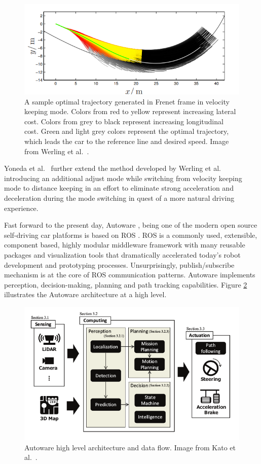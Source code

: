 \begin{figure}[h]
  \centering
  \includegraphics[width=.8\textwidth]{figures/frenet-velocity-keeping.png}
  \caption[A sample optimal trajectory generated in Frenet frame]{A sample
    optimal trajectory generated in Frenet frame in velocity keeping mode.
    Colors from red to yellow represent increasing lateral cost. Colors from
    grey to black represent increasing longitudinal cost. Green and light grey
    colors represent the optimal trajectory, which leads the car to the
    reference line and desired speed. Image from Werling et al.\
    \cite{Werling2010OptimalTG}.}
  \label{figure:frenet-velocity-keeping}
\end{figure}

Yoneda et al.\ \cite{Yoneda2018TrajectoryOA} further extend the method developed
by Werling et al.\ \cite{Werling2010OptimalTG} introducing an additional adjust
mode while switching from velocity keeping mode to distance keeping in an
effort to eliminate strong acceleration and deceleration during the mode
switching in quest of a more natural driving experience.

Fast forward to the present day, Autoware \cite{Kato2018AutowareOB}, being one
of the modern open source self-driving car platforms is based on ROS
\cite{Quigley2009ROSAO}. ROS is a commonly used, extensible, component based,
highly modular middleware framework with many reusable packages and
visualization tools that dramatically accelerated today's robot development and
prototyping processes. Unsurprisingly, publish/subscribe mechanism is at the
core of ROS communication patterns. Autoware implements perception,
decision-making, planning and path tracking capabilities. Figure
\ref{figure:autoware} illustrates the Autoware architecture at a high
level.

\begin{figure}[h]
  \centering
  \includegraphics[width=.8\textwidth]{figures/autoware.png}
  \caption[Autoware high level architecture]{Autoware high level architecture
    and data flow. Image from Kato et al.\ \cite{Kato2018AutowareOB}.}
  \label{figure:autoware}
\end{figure}

